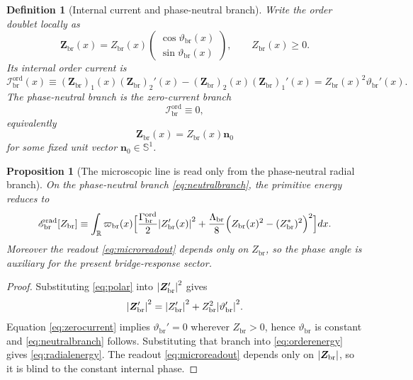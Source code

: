 \documentclass[11pt]{article}
\newcommand{\ProfWeight}{\varpi_{\mathrm{br}}}
\newcommand{\RespOrderField}{\bm Z_{\mathrm{br}}}
\newcommand{\RespOrderAmp}{Z_{\mathrm{br}}}
\newcommand{\RespOrderEq}{Z_{\mathrm{br}}^{\ast}}
\newcommand{\RespOrderStiff}{\Gamma_{\mathrm{br}}^{\mathrm{ord}}}
\newcommand{\RespOrderQuartic}{\Lambda_{\mathrm{br}}}
\newcommand{\RespOrderRadEnergy}{\mathscr E_{\mathrm{br}}^{\mathrm{rad}}}
\newcommand{\RespOrderCurrent}{\mathcal I_{\mathrm{br}}^{\mathrm{ord}}}
\newcommand{\RespOrderPhase}{\vartheta_{\mathrm{br}}}
\newcommand{\RespOrderDir}{\bm n_0}
\newtheorem{definition}{Definition}
\newtheorem{proposition}{Proposition}
\begin{document}
\begin{definition}[Internal current and phase-neutral branch]
\label{def:neutral}
Write the order doublet locally as
\begin{equation}
\RespOrderField(x)
=
\RespOrderAmp(x)
\begin{pmatrix}
\cos\RespOrderPhase(x)\\
\sin\RespOrderPhase(x)
\end{pmatrix},
\qquad
\RespOrderAmp(x)\ge 0.
\label{eq:polar}
\end{equation}
Its internal order current is
\begin{equation}
\RespOrderCurrent(x)
\equiv
(\RespOrderField)_1(x)(\RespOrderField)_2'(x)-(\RespOrderField)_2(x)(\RespOrderField)_1'(x)
=
\RespOrderAmp(x)^2\RespOrderPhase'(x).
\label{eq:ordercurrent}
\end{equation}
The \emph{phase-neutral branch} is the zero-current branch
\begin{equation}
\RespOrderCurrent\equiv 0,
\label{eq:zerocurrent}
\end{equation}
equivalently
\begin{equation}
\RespOrderField(x)=\RespOrderAmp(x)\RespOrderDir
\label{eq:neutralbranch}
\end{equation}
for some fixed unit vector \(\RespOrderDir\in\mathbb S^1\).
\end{definition}

\begin{proposition}[The microscopic line is read only from the phase-neutral radial branch]
\label{prop:neutral}
On the phase-neutral branch \eqref{eq:neutralbranch}, the primitive energy reduces to
\begin{equation}
\RespOrderRadEnergy[\RespOrderAmp]
\equiv
\int_{\mathbb R}\ProfWeight(x)\Bigl[
\frac{\RespOrderStiff}{2}\abs{\RespOrderAmp'(x)}^2
+
\frac{\RespOrderQuartic}{8}\Bigl(\RespOrderAmp(x)^2-(\RespOrderEq)^2\Bigr)^2
\Bigr]dx.
\label{eq:radialenergy}
\end{equation}
Moreover the readout \eqref{eq:microreadout} depends only on \(\RespOrderAmp\), so the phase angle is auxiliary for the present bridge-response sector.
\end{proposition}

\begin{proof}
Substituting \eqref{eq:polar} into \(\abs{\RespOrderField'}^2\) gives
\[
\abs{\RespOrderField'}^2
=
\abs{\RespOrderAmp'}^2+\RespOrderAmp^2\abs{\RespOrderPhase'}^2.
\]
Equation \eqref{eq:zerocurrent} implies \(\RespOrderPhase'=0\) wherever \(\RespOrderAmp>0\), hence \(\RespOrderPhase\) is constant and \eqref{eq:neutralbranch} follows. Substituting that branch into \eqref{eq:orderenergy} gives \eqref{eq:radialenergy}. The readout \eqref{eq:microreadout} depends only on \(\abs{\RespOrderField}\), so it is blind to the constant internal phase.
\end{proof}
\end{document}
